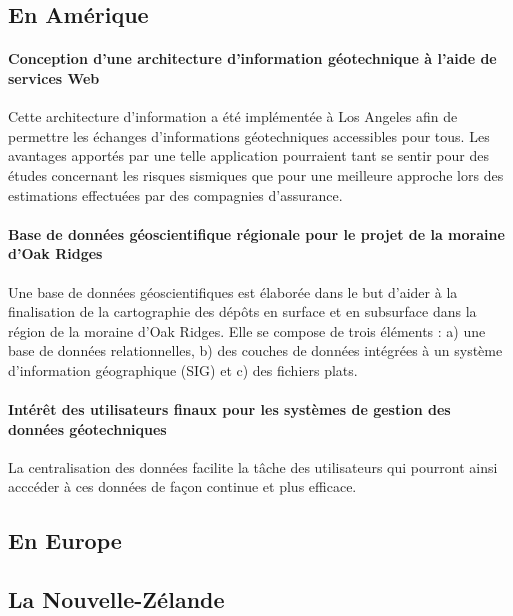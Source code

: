         \subsection{En Amérique}
        \paragraph{Conception d'une architecture d'information géotechnique à l'aide de services Web}
        Cette architecture d'information a été implémentée à Los Angeles afin de permettre les échanges 
        d'informations géotechniques accessibles pour tous. Les avantages apportés par une telle 
        application pourraient tant se sentir pour des études concernant les risques sismiques que pour 
        une meilleure approche lors des estimations effectuées par des compagnies d'assurance. 
        \cite{zimmermann2003design}
        \paragraph{Base de données géoscientifique régionale pour le projet de la moraine d'Oak Ridges}
        Une base de données géoscientifiques est élaborée dans le but d’aider à la finalisation de la 
        cartographie des dépôts en surface et en subsurface dans la région de la moraine d’Oak 
        Ridges. Elle se compose de trois éléments : a) une base de données relationnelles, 
        b) des couches de données intégrées à un système d’information géographique (SIG) 
        et c) des fichiers plats.
        \cite{russell1996regional}
        \paragraph{Intérêt des utilisateurs finaux pour les systèmes de gestion des données géotechniques}
        La centralisation des données facilite la tâche des utilisateurs qui pourront ainsi acccéder à ces
        données de façon continue et plus efficace.
        \cite{Turner2008}

        \subsection{En Europe}
        \cite{antoljak2012subsurface}
       
        \lipsum[1]
        \subsection{La Nouvelle-Zélande}
